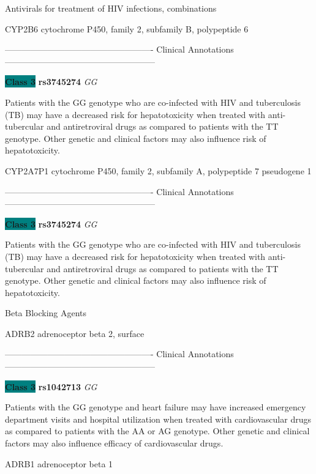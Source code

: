 \documentclass{resume} %
\begin{document}
\begin{rSection}{ Antivirals for treatment of HIV infections, combinations }
\begin{rSubsection}{ CYP2B6 }{ cytochrome P450, family 2, subfamily B, polypeptide 6 }{}{}
\item[] ---------------------------------------------------- Clinical Annotations -----------------------------------------------------\newline
\item \textbf{\colorbox{teal} {Class 3}} \textbf{ rs3745274 } \textit{ GG }
\item[] Patients with the GG genotype who are co-infected with HIV and tuberculosis (TB) may have a decreased risk for hepatotoxicity when treated with anti-tubercular and antiretroviral drugs as compared to patients with the TT genotype. Other genetic and clinical factors may also influence risk of hepatotoxicity.
\end{rSubsection}\begin{rSubsection}{ CYP2A7P1 }{ cytochrome P450, family 2, subfamily A, polypeptide 7 pseudogene 1 }{}{}
\item[]

\item[] ---------------------------------------------------- Clinical Annotations -----------------------------------------------------\newline
\item \textbf{\colorbox{teal} {Class 3}} \textbf{ rs3745274 } \textit{ GG }
\item[] Patients with the GG genotype who are co-infected with HIV and tuberculosis (TB) may have a decreased risk for hepatotoxicity when treated with anti-tubercular and antiretroviral drugs as compared to patients with the TT genotype. Other genetic and clinical factors may also influence risk of hepatotoxicity.
\end{rSubsection}

\end{rSection}\begin{rSection}{ Beta Blocking Agents }
\item[]

\begin{rSubsection}{ ADRB2 }{ adrenoceptor beta 2, surface }{}{}
\item[]

\item[] ---------------------------------------------------- Clinical Annotations -----------------------------------------------------\newline
\item \textbf{\colorbox{teal} {Class 3}} \textbf{ rs1042713 } \textit{ GG }
\item[] Patients with the GG genotype and heart failure may have increased emergency department visits and hospital utilization when treated with cardiovascular drugs as compared to patients with the AA or AG genotype. Other genetic and clinical factors may also influence efficacy of cardiovascular drugs.
\end{rSubsection}\begin{rSubsection}{ ADRB1 }{ adrenoceptor beta 1 }{}{}
\item[]


\end{rSubsection}
\end{rSection}
\end{document}
